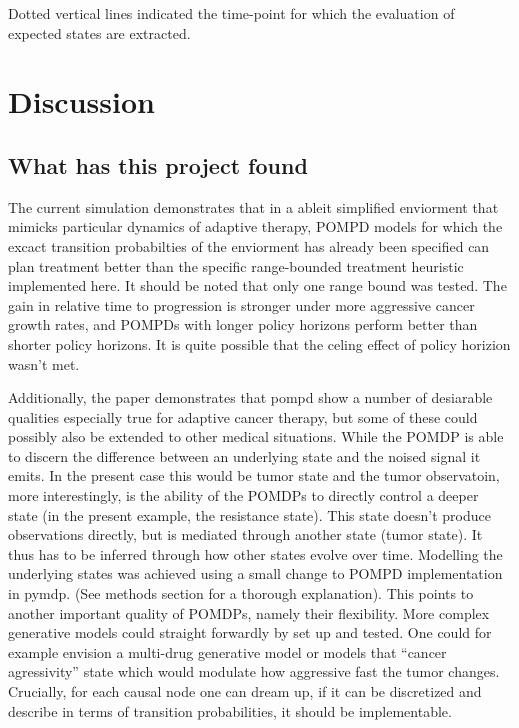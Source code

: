 \documentclass[notspecified,article,submit,moreauthors,pdftex]{Definitions/mdpi}
\begin{document}
Dotted vertical lines indicated the time-point for which the evaluation
of expected states are extracted.

\section{Discussion}\label{discussion}

\subsection{What has this project
found}\label{what-has-this-project-found}

The current simulation demonstrates that in a ableit simplified
enviorment that mimicks particular dynamics of adaptive therapy, POMPD
models for which the excact transition probabilties of the enviorment
has already been specified can plan treatment better than the specific
range-bounded treatment heuristic implemented here. It should be noted
that only one range bound was tested. The gain in relative time to
progression is stronger under more aggressive cancer growth rates, and
POMPDs with longer policy horizons perform better than shorter policy
horizons. It is quite possible that the celing effect of policy horizion
wasn't met.

Additionally, the paper demonstrates that pompd show a number of
desiarable qualities especially true for adaptive cancer therapy, but
some of these could possibly also be extended to other medical
situations. While the POMDP is able to discern the difference between an
underlying state and the noised signal it emits. In the present case
this would be tumor state and the tumor observatoin, more interestingly,
is the ability of the POMDPs to directly control a deeper state (in the
present example, the resistance state). This state doesn't produce
observations directly, but is mediated through another state (tumor
state). It thus has to be inferred through how other states evolve over
time. Modelling the underlying states was achieved using a small change
to POMPD implementation in pymdp. (See methods section for a thorough
explanation). This points to another important quality of POMDPs, namely
their flexibility. More complex generative models could straight
forwardly by set up and tested. One could for example envision a
multi-drug generative model or models that ``cancer agressivity'' state
which would modulate how aggressive fast the tumor changes. Crucially,
for each causal node one can dream up, if it can be discretized and
describe in terms of transition probabilities, it should be
implementable.
\end{document}
